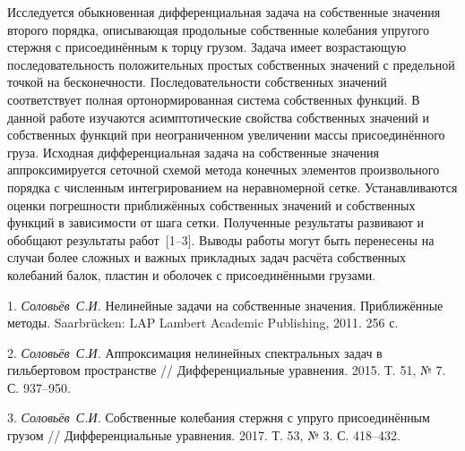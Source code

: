 \vzmscaption


Исследуется обыкновенная дифференциальная задача на собственные значения второго порядка,
описывающая продольные собственные колебания упругого стержня с присоединённым к торцу грузом.
Задача имеет возрастающую последовательность положительных простых собственных значений
с предельной точкой на бесконечности.
Последовательности собственных значений соответствует полная ортонормированная система
собственных функций.
В данной работе изучаются асимптотические свойства собственных значений и собственных функций
при неограниченном увеличении
массы присоединённого груза.
Исходная дифференциальная задача на собственные значения аппроксимируется
сеточной схемой метода конечных элементов произвольного порядка с численным интегрированием на неравномерной сетке.
Устанавливаются оценки погрешности приближённых собственных значений
и собственных функций в зависимости от шага сетки.
Полученные результаты развивают и обобщают результаты работ~[1--3].
Выводы работы могут быть перенесены на случаи
более сложных и важных прикладных задач расчёта собственных колебаний балок, пластин и оболочек
с присоединёнными грузами.



\litlist

1. {\it Соловьёв~С.И.}
Нелинейные задачи на собственные значения. Приближённые методы.
Saarbr\"ucken: LAP Lambert Academic Publishing, 2011. 256 с.

2. {\it Соловьёв~С.И.}
Аппроксимация нелинейных спектральных задач в гильбертовом пространстве
// Дифференциальные уравнения. 2015. Т. 51,
№ 7. С. 937--950.

3. {\it Соловьёв~С.И.}
Собственные колебания стержня с упруго присоединённым грузом
// Дифференциальные уравнения. 2017. Т. 53,
№ 3. С. 418--432.
